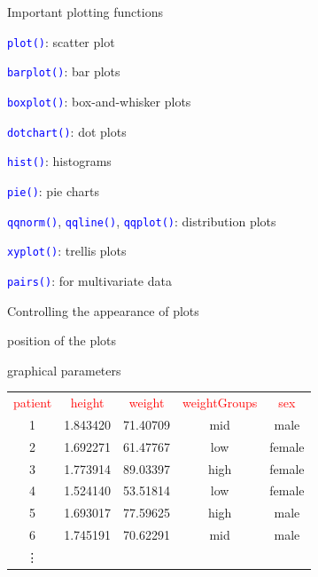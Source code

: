 \documentclass{presentatiesmetlogo}
\newcommand{\code}[1]{\textcolor{blue}{\texttt{#1}}}
\let \nl = \newline
\begin{document}
\eitem
\bitem
\item Important plotting functions
\bitemt
\item \code{plot()}: scatter plot
\item \code{barplot()}: bar plots
\item \code{boxplot()}: box-and-whisker plots
\item \code{dotchart()}: dot plots
\item \code{hist()}: histograms
\item \code{pie()}: pie charts
\item \code{qqnorm()}, \code{qqline()}, \code{qqplot()}:  distribution plots
\item \code{xyplot()}: trellis plots
\item \code{pairs()}: for multivariate data
\eitemt
\eitem
\bitem
\item Controlling the appearance of plots
\bitemt
\item position of the plots
\item graphical parameters
\eitemt
\eitem
\begin{tabular}{ccccc}
\textcolor{red}{patient} &  \textcolor{red}{height} &  \textcolor{red}{weight}  &  \textcolor{red}{weightGroups} &  \textcolor{red}{sex} \\
   1 & 1.843420 & 71.40709  &  mid  &  male \\
   2 & 1.692271 & 61.47767  &  low & female \\
   3 & 1.773914 & 89.03397  &  high  &female \\
   4 & 1.524140 & 53.51814  &  low  &female \\
   5 & 1.693017 & 77.59625  &  high  &  male \\
   6 & 1.745191 & 70.62291  &  mid  &  male\\
 \vdots &&&
\end{tabular}
\end{document}

